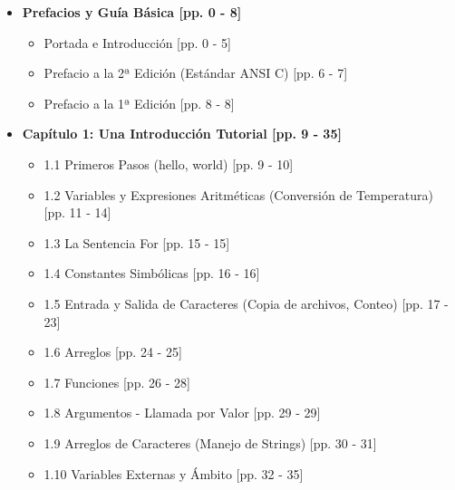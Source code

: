 \documentclass[11pt,a4paper]{article}
\begin{document}
\begin{itemize}
    \item \textbf{Prefacios y Guía Básica [pp. 0 - 8]}
    \begin{itemize}
        \item Portada e Introducción [pp. 0 - 5]
        \item Prefacio a la 2ª Edición (Estándar ANSI C) [pp. 6 - 7]
        \item Prefacio a la 1ª Edición [pp. 8 - 8]
    \end{itemize}

    \item \textbf{Capítulo 1: Una Introducción Tutorial [pp. 9 - 35]}
    \begin{itemize}
        \item 1.1 Primeros Pasos (hello, world) [pp. 9 - 10]
        \item 1.2 Variables y Expresiones Aritméticas (Conversión de Temperatura) [pp. 11 - 14]
        \item 1.3 La Sentencia For [pp. 15 - 15]
        \item 1.4 Constantes Simbólicas [pp. 16 - 16]
        \item 1.5 Entrada y Salida de Caracteres (Copia de archivos, Conteo) [pp. 17 - 23]
        \item 1.6 Arreglos [pp. 24 - 25]
        \item 1.7 Funciones [pp. 26 - 28]
        \item 1.8 Argumentos - Llamada por Valor [pp. 29 - 29]
        \item 1.9 Arreglos de Caracteres (Manejo de Strings) [pp. 30 - 31]
        \item 1.10 Variables Externas y Ámbito [pp. 32 - 35]
    \end{itemize}


\end{itemize}
\end{document}
